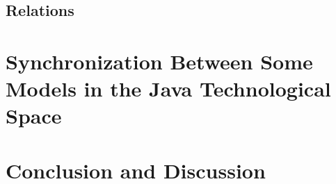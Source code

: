 \documentclass[tuberlin,cic,tc,openright,english,noabntcite]{iiufrgs}
\begin{document}
\section{Relations}

\chapter{Synchronization Between Some Models in the Java Technological Space}

\chapter{Conclusion and Discussion}



\end{document}
